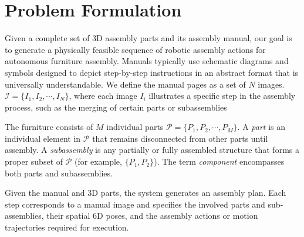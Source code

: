 \section{Problem Formulation}
\label{sec:method-formulation}
Given a complete set of 3D assembly parts and its assembly manual, our goal is to generate a physically feasible sequence of robotic assembly actions for autonomous furniture assembly. Manuals typically use schematic diagrams and symbols designed to depict step-by-step instructions in an abstract format that is universally understandable. We define the manual pages as a set of $N$ images. $\mathcal{I} = \{I_1, I_2, \cdots, I_N\}$, where each image $I_i$ illustrates a specific step in the assembly process, such as the merging of certain parts or subassemblies

The furniture consists of $M$ individual parts $\mathcal{P} = \{P_1, P_2, \cdots, P_M\}$. A \emph{part} is an individual element in $\mathcal{P}$ that remains disconnected from other parts until assembly. A \emph{subassembly} is any partially or fully assembled structure that forms a proper subset of $\mathcal{P}$ (for example, $\{P_1, P_2\}$). The term \emph{component} encompasses both parts and subassemblies.

Given the manual and 3D parts, the system generates an assembly plan. Each step corresponds to a manual image and specifies the involved parts and sub-assemblies, their spatial 6D poses, and the assembly actions or motion trajectories required for execution. 